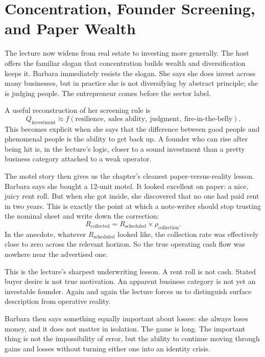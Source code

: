 \section{Concentration, Founder Screening, and Paper Wealth}

The lecture now widens from real estate to investing more generally. The host offers the familiar slogan that concentration builds wealth and diversification keeps it. Barbara immediately resists the slogan. She says she does invest across many businesses, but in practice she is not diversifying by abstract principle; she is judging people. The entrepreneur comes before the sector label.

A useful reconstruction of her screening rule is
\begin{equation}
Q_{\text{investment}}
\approx
f(\text{resilience},\ \text{sales ability},\ \text{judgment},\ \text{fire-in-the-belly}).
\end{equation}
This becomes explicit when she says that the difference between good people and phenomenal people is the ability to get back up. A founder who can rise after being hit is, in the lecture's logic, closer to a sound investment than a pretty business category attached to a weak operator.

The motel story then gives us the chapter's cleanest paper-versus-reality lesson. Barbara says she bought a 12-unit motel. It looked excellent on paper: a nice, juicy rent roll. But when she got inside, she discovered that no one had paid rent in two years. This is exactly the point at which a note-writer should stop trusting the nominal sheet and write down the correction:
\begin{equation}
R_{\text{collected}}=R_{\text{scheduled}}\times \rho_{\text{collection}}.
\end{equation}
In the anecdote, whatever \(R_{\text{scheduled}}\) looked like, the collection rate was effectively close to zero across the relevant horizon. So the true operating cash flow was nowhere near the advertised one.

This is the lecture's sharpest underwriting lesson. A rent roll is not cash. Stated buyer desire is not true motivation. An apparent business category is not yet an investable founder. Again and again the lecture forces us to distinguish surface description from operative reality.

Barbara then says something equally important about losses: she always loses money, and it does not matter in isolation. The game is long. The important thing is not the impossibility of error, but the ability to continue moving through gains and losses without turning either one into an identity crisis.


